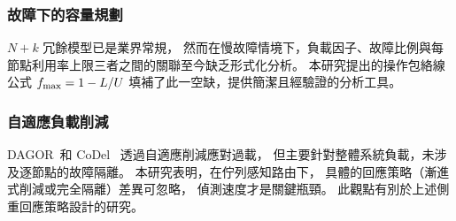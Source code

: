 \subsubsection*{故障下的容量規劃}

$N+k$ 冗餘模型已是業界常規，
然而在慢故障情境下，負載因子、故障比例與每節點利用率上限三者之間的關聯至今缺乏形式化分析。
本研究提出的操作包絡線公式 $f_{\max} = 1 - L/U$
填補了此一空缺，提供簡潔且經驗證的分析工具。

\subsubsection*{自適應負載削減}

DAGOR~\cite{zhang2021dagor}和 CoDel~\cite{nichols2012codel}
透過自適應削減應對過載，
但主要針對整體系統負載，未涉及逐節點的故障隔離。
本研究表明，在佇列感知路由下，
具體的回應策略（漸進式削減或完全隔離）差異可忽略，
偵測速度才是關鍵瓶頸。
此觀點有別於上述側重回應策略設計的研究。
